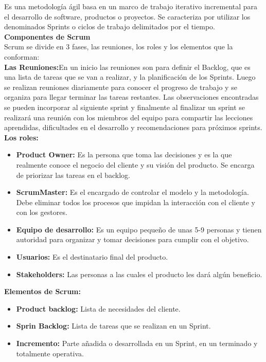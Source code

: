 \documentclass[11pt,openany]{book}
\begin{document}
	Es una metodología ágil basa en un marco de trabajo iterativo incremental para el desarrollo de software, productos o proyectos. Se caracteriza por utilizar los denominados Sprints o ciclos de trabajo delimitados por el tiempo.\\
	\textbf{Componentes de Scrum}\\[0.25cm]
	Scrum se divide en 3 fases, las reuniones, los roles y los elementos que la conforman:\\
	\textbf{Las Reuniones:}En un inicio las reuniones son para definir el Backlog, que es una lista de tareas que se van a realizar, y la planificación de los Sprints. Luego se realizan reuniones diariamente para conocer el progreso de trabajo y se organiza para llegar terminar las tareas restantes. Las observaciones encontradas se pueden incorporar al siguiente sprint y finalmente al finalizar un sprint se realizará una reunión con los miembros del equipo para compartir las lecciones aprendidas, dificultades en el desarrollo y recomendaciones para próximos sprints.\\ 
	\textbf{Los roles: }
	\begin{itemize}
		\item \textbf{Product Owner: }Es la persona que toma las decisiones y es la que realmente conoce el negocio del cliente y su visión del producto. Se encarga de priorizar las tareas en el backlog.
		\item \textbf{ScrumMaster: }Es el encargado de controlar el modelo y la metodología. Debe eliminar todos los procesos que impidan la interacción con el cliente y con los gestores.
		\item \textbf{Equipo de desarrollo: }Es un equipo pequeño de unas 5-9 personas y tienen autoridad para organizar y tomar decisiones para cumplir con el objetivo.
		\item \textbf{Usuarios: }Es el destinatario final del producto.
		\item \textbf{Stakeholders: }Las personas a las cuales el producto les dará algún beneficio.
	\end{itemize}
	\textbf{Elementos de Scrum: }
	\begin{itemize}
		\item \textbf{Product backlog: }Lista de necesidades del cliente.
		\item \textbf{Sprin Backlog: }Lista de tareas que se realizan en un Sprint.
		\item \textbf{Incremento: }Parte añadida o desarrollada en un Sprint, en un terminado y totalmente operativa.
	\end{itemize}
\end{document}
